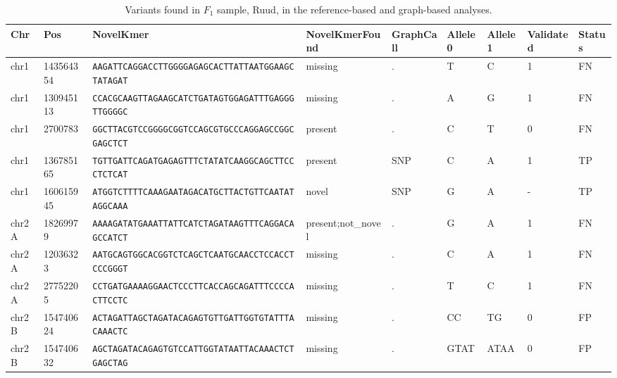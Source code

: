 \begin{landscape}
\begin{table}[]
\tiny
\centering
\caption{Variants found in $F_1$ sample, Ruud, in the reference-based and graph-based analyses.}
\label{tbl:ruud_ref_vs_graph}
\begin{tabular}{@{}lllllllll@{}}
\toprule
Chr   & Pos       & NovelKmer                                                & NovelKmerFound     & GraphCall & Allele0  & Allele1             & Validated & Status \\ \midrule
chr1  & 143564354 & \texttt{AAGATTCAGGACCTTGGGGAGAGCACTTATTAATGGAAGCTATAGAT} & missing            & .         & T        & C                   & 1         & FN     \\
chr1  & 130945113 & \texttt{CCACGCAAGTTAGAAGCATCTGATAGTGGAGATTTGAGGGTTGGGGC} & missing            & .         & A        & G                   & 1         & FN     \\
chr1  & 2700783   & \texttt{GGCTTACGTCCGGGGCGGTCCAGCGTGCCCAGGAGCCGGCGAGCTCT} & present            & .         & C        & T                   & 0         & FN     \\
chr1  & 136785165 & \texttt{TGTTGATTCAGATGAGAGTTTCTATATCAAGGCAGCTTCCCTCTCAT} & present            & SNP       & C        & A                   & 1         & TP     \\
chr1  & 160615945 & \texttt{ATGGTCTTTTCAAAGAATAGACATGCTTACTGTTCAATATAGGCAAA} & novel              & SNP       & G        & A                   & -         & TP     \\
chr2A & 18269979  & \texttt{AAAAGATATGAAATTATTCATCTAGATAAGTTTCAGGACAGCCATCT} & present;not\_novel & .         & G        & A                   & 1         & FN     \\
chr2A & 12036323  & \texttt{AATGCAGTGGCACGGTCTCAGCTCAATGCAACCTCCACCTCCCGGGT} & missing            & .         & C        & A                   & 1         & FN     \\
chr2A & 27752205  & \texttt{CCTGATGAAAAGGAACTCCCTTCACCAGCAGATTTCCCCACTTCCTC} & missing            & .         & T        & C                   & 1         & FN     \\
chr2B & 154740624 & \texttt{ACTAGATTAGCTAGATACAGAGTGTTGATTGGTGTATTTACAAACTC} & missing            & .         & CC       & TG                  & 0         & FP     \\
chr2B & 154740632 & \texttt{AGCTAGATACAGAGTGTCCATTGGTATAATTACAAACTCTGAGCTAG} & missing            & .         & GTAT     & ATAA                & 0         & FP     \\

\end{tabular}
\end{table}
\end{landscape}
